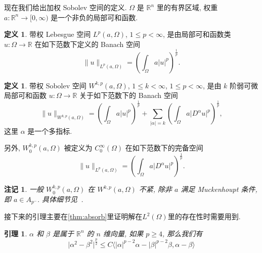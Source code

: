 \documentclass[oneside,longtitle]{LZUthesis}
\newtheorem{lemma}[theorem]{引理}
\newtheorem{remark}[theorem]{注记}
\theoremstyle{definition}
\newtheorem{definition}[theorem]{定义}
\numberwithin{equation}{chapter}
\newcommand*\abs[1]{\lvert#1\rvert}
\newcommand*\norm[1]{\lVert#1\rVert}
\newcommand\R{\mathbb{R}}
\begin{document}
现在我们给出加权 Sobolev 空间的定义.
$\Omega$ 是 $\R^n$ 里的有界区域, 权重
$a \colon \R^n \to [0, \infty)$
是一个非负的局部可和函数.
\begin{definition}
	带权 Lebesgue 空间 $L^p(a, \Omega)$, $1 \leq p < \infty$,
	是由局部可和函数类
	$u \colon \Omega \to \R$ 在如下范数下定义的 Banach 空间
	\begin{equation*}
		\norm{u}_{L^p(a,\Omega)} =
		\left( \int_{\Omega}a\abs{u}^p \right)^{\frac{1}{p}}.
	\end{equation*}
\end{definition}
\begin{definition}
	带权 Sobolev 空间 $W^{k,p}(a,\Omega)$,
	$1 \leq k < \infty$, $1 \leq p < \infty$,
	是由 $k$ 阶弱可微局部可和函数
	$u \colon \Omega \to \R$ 关于如下范数下的 Banach 空间
	\begin{equation*}
		\norm{u}_{W^{k,p}(a,\Omega)} =
		\left( \int_{\Omega}a\abs{u}^p \right)^{\frac{1}{p}}
		+ \sum_{\abs{\alpha}=k}
		\left( \int_{\Omega}a\abs{D^{\alpha}u}^p \right)^{\frac{1}{p}},
	\end{equation*}
	这里 $\alpha$ 是一个多指标.

	另外,
	$W_0^{k,p}(a,\Omega)$ 被定义为
	$C_0^{\infty}(\Omega)$ 在如下范数下的完备空间
	\begin{equation*}
		\norm{u}_{L^p(a,\Omega)} =
		\left( \int_{\Omega}a\abs{D^{\alpha}u}^p \right)^{\frac{1}{p}}.
	\end{equation*}
\end{definition}
\begin{remark}
	一般 $W_0^{k,p}(a,\Omega)$ 在
	$W^{k,p}(a,\Omega)$ 不紧, 除非 $a$ 满足 Muckenhoupt 条件, 即 $a \in A_{p^-}$. 具体细节见~\cite{goldshteinWeightedSobolevSpaces2009}.
\end{remark}
接下来的引理主要在\cref{thm:absorb}里证明解在$L^2(\Omega)$里的存在性时需要用到.
\begin{lemma}\label{lem:VecIneq}
	$\alpha$ 和 $\beta$ 是属于 $\R^{n}$ 的 $n$ 维向量, 如果 $p \geq 4$, 那么我们有
	\begin{equation}
		\abs{\alpha^2 - \beta^2}^{\frac{p}{2}}
		\leq C \langle \abs{\alpha}^{p-2}\alpha - \abs{\beta}^{p-2}\beta, \alpha-\beta\rangle
	\end{equation}
\end{lemma}
\end{document}
